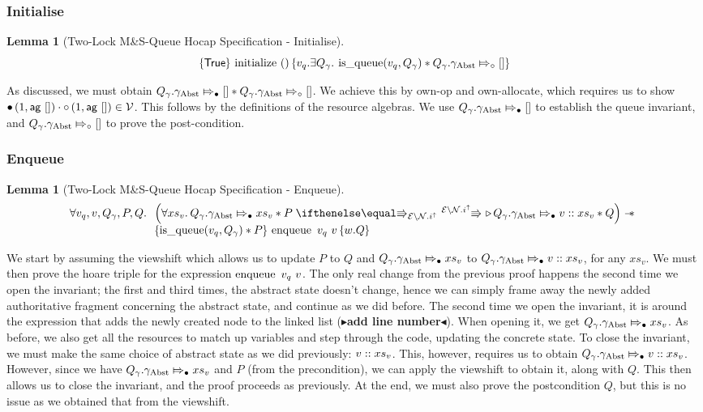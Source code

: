 \documentclass[a4paper, 10pt]{report}
\theoremstyle{definition}
\newtheorem{lemma}[theorem]{Lemma}
\newcommand{\initialise}{\operatorname{initialize}}
\newcommand{\enqueue}{\operatorname{enqueue}}
\newcommand{\msq}{M\&S-Queue\xspace}
\newcommand{\tlmsq}{Two-Lock \msq}
\newcommand{\isqueue}{\operatorname{is\_queue}}
\newcommand{\vq}{v_q}
\newcommand{\absvalue}{\val}
\newcommand{\absvalueList}{xs_v}
\newcommand{\Qg}{Q_\gname}
\newcommand{\gabst}{\gname_{\mathrm{Abst}}}
\newcommand{\Vl}{\ensuremath{\mathcal{V}}}
\newcommand{\Nl}{\ensuremath{\mathcal{N}}}
\newcommand{\abstractstatefullfrag}[2]{#1 \Mapsto_{\circ} #2}
\newcommand{\abstractstateauth}[2]{#1 \Mapsto_{\bullet} #2}
\newcommand{\tlhocapspecinit}{\hoare{\TRUE}{\initialise \ \TT}{\vq . \Exists \Qg . \isqueue(\vq, \Qg) \star \abstractstatefullfrag{\Qg.\gabst}{[]}}}
\newcommand{\tlhocapspecenq}{\All \vq, \absvalue, \Qg, P, Q.
\begin{array}[t]{l}
\left(\All \absvalueList . \abstractstateauth{\Qg.\gabst}{\absvalueList} \star P \vs[\mask\setminus\Nl.i^\uparrow] \later \abstractstateauth{\Qg.\gabst}{\absvalue :: \absvalueList} \star Q \right)
\wand\\
\hoare{\isqueue(\vq, \Qg) \star P}{\enqueue \ \vq \ \absvalue}{\valB . Q}
\end{array}}
\newcommand{\todo}[1]{{\color[rgb]{.5,0,0}\textbf{$\blacktriangleright$#1$\blacktriangleleft$}}}
\begin{document}
\subsubsection{Initialise}
\begin{lemma}[\tlmsq Hocap Specification - Initialise]\label{TLMSQ:spec:hocap:initialise}
  \begin{equation*}
    \tlhocapspecinit
  \end{equation*}
\end{lemma}
As discussed, we must obtain $\abstractstateauth{\Qg.\gabst}{[]} \star \abstractstatefullfrag{\Qg.\gabst}{[]}$. We achieve this by own-op and own-allocate, which requires us to show $\authfull (1, \aginj ~ []) \mtimes \authfrag (1, \aginj ~ []) \in \Vl$. This follows by the definitions of the resource algebras. We use $\abstractstateauth{\Qg.\gabst}{[]}$ to establish the queue invariant, and $\abstractstatefullfrag{\Qg.\gabst}{[]}$ to prove the post-condition.\\


\subsubsection{Enqueue}
\begin{lemma}[\tlmsq Hocap Specification - Enqueue]\label{TLMSQ:spec:hocap:enqueue}
  \begin{equation*}
    \tlhocapspecenq
  \end{equation*}
\end{lemma}
We start by assuming the viewshift which allows us to update $P$ to $Q$ and $\abstractstateauth{\Qg.\gabst}{\absvalueList}$ to $\abstractstateauth{\Qg.\gabst}{\absvalue :: \absvalueList}$, for any $\absvalueList$. We must then prove the hoare triple for the expression $\enqueue \ \vq \ \absvalue$. The only real change from the previous proof happens the second time we open the invariant; the first and third times, the abstract state doesn't change, hence we can simply frame away the newly added authoritative fragment concerning the abstract state, and continue as we did before. The second time we open the invariant, it is around the expression that adds the newly created node to the linked list (\todo{add line number}). When opening it, we get $\abstractstateauth{\Qg.\gabst}{\absvalueList}$. As before, we also get all the resources to match up variables and step through the code, updating the concrete state. To close the invariant, we must make the same choice of abstract state as we did previously: $\absvalue :: \absvalueList$. This, however, requires us to obtain $\abstractstateauth{\Qg.\gabst}{\absvalue :: \absvalueList}$. However, since we have $\abstractstateauth{\Qg.\gabst}{\absvalueList}$ and $P$ (from the precondition), we can apply the viewshift to obtain it, along with $Q$. This then allows us to close the invariant, and the proof proceeds as previously. At the end, we must also prove the postcondition $Q$, but this is no issue as we obtained that from the viewshift.
\end{document}
